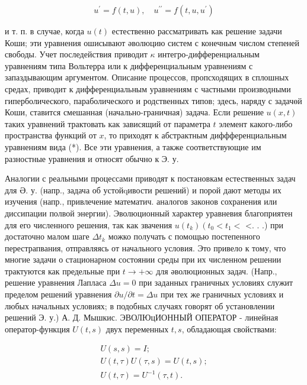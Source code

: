 \documentclass[10pt]{article}
\begin{document}
\[

u^{\prime}=f(t, u), \quad u^{\prime \prime}=f\left(t, u, u^{\prime}\right)

\]



и т. п. в случае, когда $u(t)$ естественно рассматривать как решение задачи Коши; эти уравнения ошисывают әволюцию систем с конечным числом степеней свободы. Учет последействия приводит $\kappa$ интегро-дифференциальным уравнениям типа Вольтерра или к дифференциальным уравнениям с запаздывающим аргументом. Описание процессов, пропсходящих в сплошных средах, приводит к дифференциальным уравнениям с частными производными гиперболического, параболического и родственных типов; здесь, наряду с задачөй Коши, ставится смешанная (начально-граничная) задача. Если решение $u(x, t)$ таких уравнений трактовать как зависящий от параметра $t$ элемент какого-либо пространства функций от $x$, то приходят к абстрактным диффференциальным уравнениям вида (*). Все эти уравнения, а также соответствующие им разностные уравнения и относят обычно к Э. у.



Аналогии с реальными процессами приводят к постановкам естественных задач для Ә. у. (напр., задача об устойqивости решений) и порой дают методы их изучения (напр., привлечение математич. аналогов законов сохранения или диссипации полвой энергии). Эволюционный характер уравневия благоприятен для его численного решения, так как звачения $u\left(t_{k}\right)\left(t_{0}<t_{1}<\right.$ <. . .) при достаточно малом шаге $\Delta t_{k}$ можко получать с помощью постепенного перестрапвания, отправляясь от начального условия. Это привело к тому, что многие задачи о стационарном состоянии среды при их численном решении трактуются как предельные при $t \rightarrow+\infty$ для әволюционных задач. (Напр., решение уравнения Лапласа $\Delta u=0$ при заданных граничных условиях служит пределом решений уравнения $\partial u / \partial t=\Delta u$ при тех же граничных условиях и любых начальных условиях; в подобных случаях говорят об установлении решений Э. у.) А. Д. Мышкис. ЭВОЛЮцИОННЫЙ ОПЕРАТОР - линейная оператор-функция $U(t, s)$ двух переменных $t, s$, обладающая свойствами:



\[

\begin{gathered}

U(s, s)=I ; \\

U(t, \tau) U(\tau, s)=U(t, s) ; \\

U(t, \tau)=U^{-1}(\tau, t) .

\end{gathered}

\]
\end{document}

